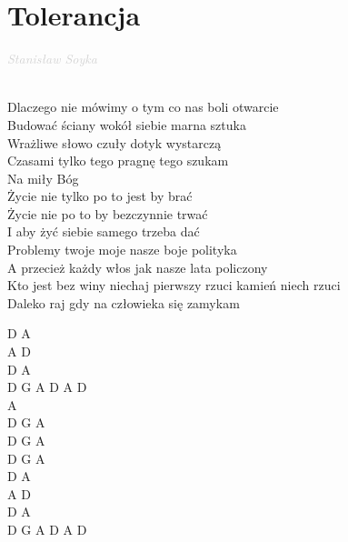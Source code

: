 \documentclass[a5paper, 10pt]{book}
\begin{document}
\section{Tolerancja}\textcolor{lightgray}{\textit{Stanisław Soyka}}\\~\\
\begin{minipage}[t]{0.75\textwidth}
Dlaczego nie mówimy o tym co nas boli otwarcie\\
Budować ściany wokół siebie marna sztuka\\
Wrażliwe słowo czuły dotyk wystarczą\\
Czasami tylko tego pragnę tego szukam\\

\hspace*{5mm}Na miły Bóg\\
\hspace*{5mm}Życie nie tylko po to jest by brać\\
\hspace*{5mm}Życie nie po to by bezczynnie trwać\\
\hspace*{5mm}I aby żyć siebie samego trzeba dać\\

Problemy twoje moje nasze boje polityka\\
A przecież każdy włos jak nasze lata policzony\\
Kto jest bez winy niechaj pierwszy rzuci kamień niech rzuci\\
Daleko raj gdy na człowieka się zamykam\\

\end{minipage}
\begin{minipage}[t]{0.25\textwidth}
D A\\
A D\\
D A\\
D G A D A D\\

A\\
D G A\\
D G A\\
D G A\\

D A\\
A D\\
D A\\
D G A D A D\\

\end{minipage}
\end{document}
